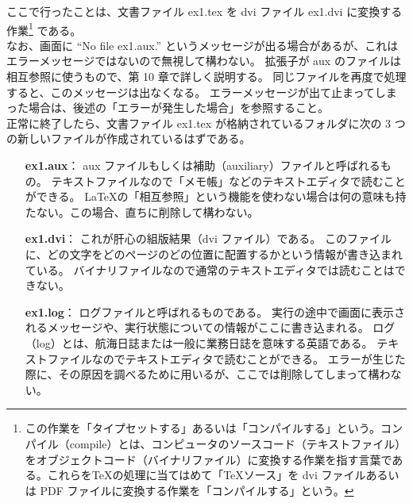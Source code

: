 ここで行ったことは、文書ファイル ex1.tex を dvi ファイル ex1.dvi に変換する作業\footnote{この作業を「タイプセットする」あるいは「コンパイルする」という。コンパイル（compile）とは、コンピュータのソースコード（テキストファイル）をオブジェクトコード（バイナリファイル）に変換する作業を指す言葉である。これらを\TeX{}の処理に当てはめて「\TeX{}ソース」を dvi ファイルあるいは PDF ファイルに変換する作業を「コンパイルする」という。} である。\\

なお、画面に ``No file ex1.aux.'' というメッセージが出る場合があるが、これはエラーメッセージではないので無視して構わない。
拡張子が aux のファイルは相互参照に使うもので、第 10 章で詳しく説明する。
同じファイルを再度\pLaTeX{}で処理すると、このメッセージは出なくなる。
エラーメッセージが出て止まってしまった場合は、後述の「エラーが発生した場合」を参照すること。\\

正常に終了したら、文書ファイル ex1.tex が格納されているフォルダに次の 3 つの新しいファイルが作成されているはずである。
\begin{itemize}\setlength{\leftskip}{1.90zw}%
\item[\textbf{ex1.aux}：]
  aux ファイルもしくは補助（auxiliary）ファイルと呼ばれるもの。
  テキストファイルなので「メモ帳」などのテキストエディタで読むことができる。
  \LaTeX{}の「相互参照」という機能を使わない場合は何の意味も持たない。この場合、直ちに削除して構わない。
\item[\textbf{ex1.dvi}：]
  これが肝心の組版結果（dvi ファイル）である。
  このファイルに、どの文字をどのページのどの位置に配置するかという情報が書き込まれている。
  バイナリファイルなので通常のテキストエディタでは読むことはできない。
\item[\textbf{ex1.log}：]
  ログファイルと呼ばれるものである。
  実行の途中で画面に表示されるメッセージや、実行状態についての情報がここに書き込まれる。
  ログ（log）とは、航海日誌または一般に業務日誌を意味する英語である。
  テキストファイルなのでテキストエディタで読むことができる。
  エラーが生じた際に、その原因を調べるために用いるが、ここでは削除してしまって構わない。
\end{itemize}
